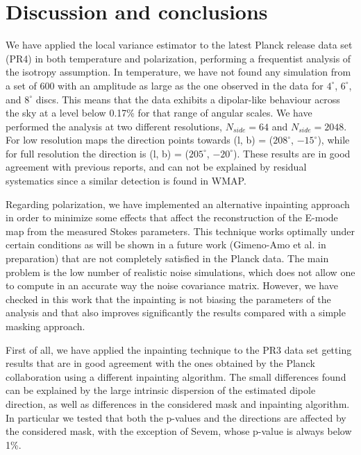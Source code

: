 \section{Discussion and conclusions} \label{Con}

We have applied the local variance estimator to the latest Planck release data set (PR4) in both temperature and polarization, performing a frequentist analysis of the isotropy assumption. In temperature, we have not found any simulation from a set of 600 with an amplitude as large as the one observed in the data for $4^{\circ}$, $6^{\circ}$, and $8^{\circ}$ discs. This means that the data exhibits a dipolar-like behaviour across the sky at a level below 0.17\% for that range of angular scales. We have performed the analysis at two different resolutions, $N_{side} = 64$ and $N_{side} = 2048$. For low resolution maps the direction points towards (l, b) = ($208^{\circ}$, $-15^{\circ}$), while for full resolution the direction is (l, b) = ($205^{\circ}$, $-20^{\circ}$). These results are in good agreement with previous reports, and can not be explained by residual systematics since a similar detection is found in WMAP.

Regarding polarization, we have implemented an alternative inpainting approach in order to minimize some effects that affect the reconstruction of the E-mode map from the measured Stokes parameters. This technique works optimally under certain conditions as will be shown in a future work (Gimeno-Amo et al. in preparation) that are not completely satisfied in the Planck data. The main problem is the low number of realistic noise simulations, which does not allow one to compute in an accurate way the noise covariance matrix. However, we have checked in this work that the inpainting is not biasing the parameters of the analysis and that also improves significantly the results compared with a simple masking approach.

First of all, we have applied the inpainting technique to the PR3 data set getting results that are in good agreement with the ones obtained by the Planck collaboration using a different inpainting algorithm. 
The small differences found can be explained by the large intrinsic dispersion of the estimated dipole direction, as well as differences in the considered mask and inpainting algorithm.
In particular we tested that both the p-values and the directions are affected by the considered mask, with the exception of Sevem,
whose p-value is always below 1\%.

